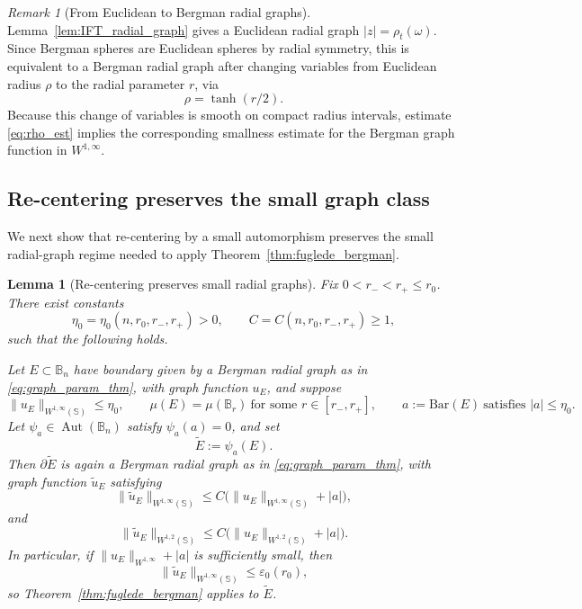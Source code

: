 \documentclass[11pt]{amsart}
\theoremstyle{plain}
\newtheorem{lemma}[theorem]{Lemma}
\theoremstyle{definition}
\theoremstyle{remark}
\newtheorem{remark}[theorem]{Remark}
\newcommand{\B}{\mathbb{B}}
\newcommand{\Sph}{\mathbb{S}}
\DeclareMathOperator{\Aut}{Aut}
\begin{document}
\begin{remark}[From Euclidean to Bergman radial graphs]\label{rem:euclidean_to_bergman_graph}
Lemma~\ref{lem:IFT_radial_graph} gives a Euclidean radial graph \( |z|=\rho_t(\omega)\).
Since Bergman spheres are Euclidean spheres by radial symmetry, this is equivalent to a Bergman radial graph
after changing variables from Euclidean radius \(\rho\) to the radial parameter \(r\), via
\[
\rho=\tanh(r/2).
\]
Because this change of variables is smooth on compact radius intervals, estimate \eqref{eq:rho_est} implies the corresponding
smallness estimate for the Bergman graph function in \(W^{1,\infty}\).
\end{remark}

\subsection{Re-centering preserves the small graph class}

We next show that re-centering by a small automorphism preserves the small radial-graph regime needed to apply
Theorem~\ref{thm:fuglede_bergman}.

\begin{lemma}[Re-centering preserves small radial graphs]\label{lem:recenter_preserves_graph}
Fix \(0<r_-<r_+\le r_0\). There exist constants
\[
\eta_0=\eta_0(n,r_0,r_-,r_+)>0,
\qquad
C=C(n,r_0,r_-,r_+)\ge 1,
\]
such that the following holds.

Let \(E\subset\B_n\) have boundary given by a Bergman radial graph as in \eqref{eq:graph_param_thm},
with graph function \(u_E\), and suppose
\[
\|u_E\|_{W^{1,\infty}(\Sph)}\le \eta_0,
\qquad
\mu(E)=\mu(\B_r)\ \text{for some }r\in[r_-,r_+],
\qquad
a:=\mathrm{Bar}(E)\ \text{satisfies }|a|\le \eta_0.
\]
Let \(\psi_a\in\Aut(\B_n)\) satisfy \(\psi_a(a)=0\), and set
\[
\widetilde E:=\psi_a(E).
\]
Then \(\partial\widetilde E\) is again a Bergman radial graph as in \eqref{eq:graph_param_thm}, with graph function
\(\widetilde u_E\) satisfying
\begin{equation}\label{eq:recenter_W1inf_bound_fixed_appendix}
\|\widetilde u_E\|_{W^{1,\infty}(\Sph)}
\le
C\bigl(\|u_E\|_{W^{1,\infty}(\Sph)}+|a|\bigr),
\end{equation}
and
\begin{equation}\label{eq:recenter_W12_bound_fixed_appendix}
\|\widetilde u_E\|_{W^{1,2}(\Sph)}
\le
C\bigl(\|u_E\|_{W^{1,2}(\Sph)}+|a|\bigr).
\end{equation}
In particular, if \(\|u_E\|_{W^{1,\infty}}+|a|\) is sufficiently small, then
\[
\|\widetilde u_E\|_{W^{1,\infty}(\Sph)}\le \varepsilon_0(r_0),
\]
so Theorem~\ref{thm:fuglede_bergman} applies to \(\widetilde E\).
\end{lemma}
\end{document}

